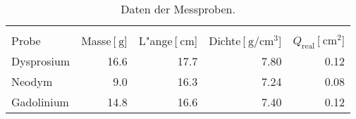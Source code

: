 
\begin{table}[!h]
\begin{center}
\begin{tabular}{|l|r|r|r|r|}
\hline
 & &&&\\
Probe & Masse\,[$\SI{}{\gram}$] & L"ange\,[$\SI{}{\centi\meter}$] & Dichte\,[$\SI{}{\gram\per\centi\meter^3}$] & $Q_\mathrm{real}$\,[$\SI{}{\centi\meter^2}$]\\
\hline
\hline

Dysprosium & 16.6 & 17.7 & 7.80 & 0.12\\
Neodym & 9.0 & 16.3 & 7.24 & 0.08\\
Gadolinium & 14.8 & 16.6 & 7.40 & 0.12\\

\hline
\end{tabular}
\caption{Daten der Messproben.}
\label{daten}
\end{center}
\end{table}